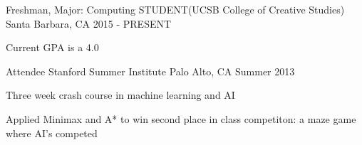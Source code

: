 \begin{cventries}
  \cventry
    {Freshman, Major: Computing}
    {STUDENT(UCSB College of Creative Studies)}
    {Santa Barbara, CA}
    {2015 - PRESENT}
    {
      \begin{cvitems}
        \item {Current GPA is a 4.0}
      \end{cvitems}
    }
  \cventry
    {Attendee}
    {Stanford Summer Institute}
    {Palo Alto, CA}
    {Summer 2013}
    {
      \begin{cvitems}
        \item {Three week crash course in machine learning and AI}
        \item {Applied Minimax and A* to win second place in class competiton: a maze game where AI's competed}
      \end{cvitems}
    }
\end{cventries}
